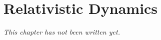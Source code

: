 \chapter{Relativistic Dynamics}\label{ch:b3:relativistic-dynamics}


\emph{This chapter has not been written yet.}
